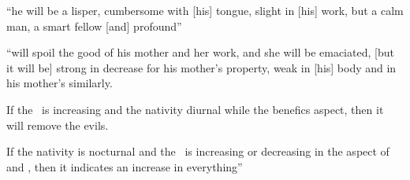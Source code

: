 \begin{description}[style=multiline,leftmargin=1.5cm]
\item[\Saturn,\Mercury]
``he will be a lisper, cumbersome with [his] tongue, slight in [his] work, but a calm man, a smart fellow [and] profound''

\item[\Saturn,\Moon]
``will spoil the good of his mother and her work, and she will be emaciated, [but it will be] strong in decrease for his mother's property, weak in [his] body and in his mother's similarly. 

If the \Moon\, is increasing and the nativity diurnal while the benefics aspect, then it will remove the evils. 

If the nativity is nocturnal and the \Moon\, is increasing or decreasing in the aspect of \Jupiter\, and \Venus, then it indicates an increase in everything''

\end{description}